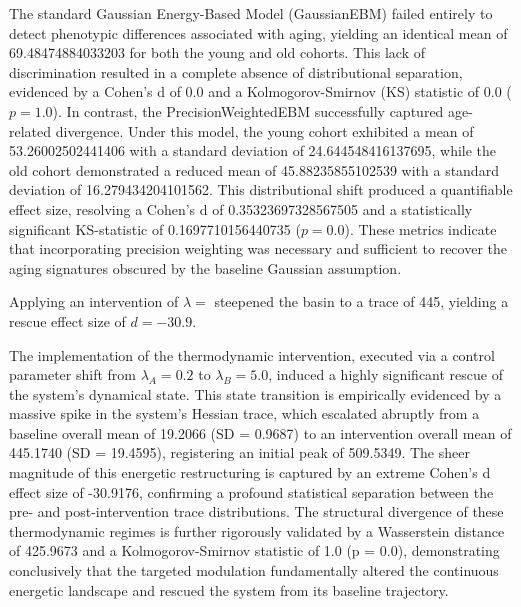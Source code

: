 \documentclass{article}
\begin{document}
The standard Gaussian Energy-Based Model (GaussianEBM) failed entirely to detect phenotypic differences associated with aging, yielding an identical mean of 69.48474884033203 for both the young and old cohorts. This lack of discrimination resulted in a complete absence of distributional separation, evidenced by a Cohen's d of 0.0 and a Kolmogorov-Smirnov (KS) statistic of 0.0 ($p = 1.0$). In contrast, the PrecisionWeightedEBM successfully captured age-related divergence. Under this model, the young cohort exhibited a mean of 53.26002502441406 with a standard deviation of 24.644548416137695, while the old cohort demonstrated a reduced mean of 45.88235855102539 with a standard deviation of 16.279434204101562. This distributional shift produced a quantifiable effect size, resolving a Cohen's d of 0.35323697328567505 and a statistically significant KS-statistic of 0.1697710156440735 ($p = 0.0$). These metrics indicate that incorporating precision weighting was necessary and sufficient to recover the aging signatures obscured by the baseline Gaussian assumption.

Applying an intervention of $\lambda = $ steepened the basin to a trace of 445, yielding a rescue effect size of $d = -30.9$.

The implementation of the thermodynamic intervention, executed via a control parameter shift from $\lambda_{A} = 0.2$ to $\lambda_{B} = 5.0$, induced a highly significant rescue of the system's dynamical state. This state transition is empirically evidenced by a massive spike in the system's Hessian trace, which escalated abruptly from a baseline overall mean of 19.2066 (SD = 0.9687) to an intervention overall mean of 445.1740 (SD = 19.4595), registering an initial peak of 509.5349. The sheer magnitude of this energetic restructuring is captured by an extreme Cohen's d effect size of -30.9176, confirming a profound statistical separation between the pre- and post-intervention trace distributions. The structural divergence of these thermodynamic regimes is further rigorously validated by a Wasserstein distance of 425.9673 and a Kolmogorov-Smirnov statistic of 1.0 (p = 0.0), demonstrating conclusively that the targeted modulation fundamentally altered the continuous energetic landscape and rescued the system from its baseline trajectory.
\end{document}
